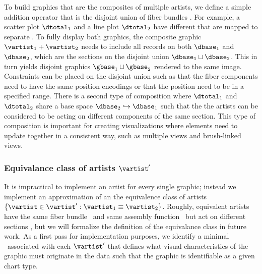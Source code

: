 \documentclass[../main.tex]{subfiles}
\begin{document}
To build graphics that are the composites of multiple artists, we define a simple addition operator that is the disjoint union of fiber bundles \dtotal.  For example, a scatter plot $\dtotal_1$ and a line plot $\dtotal_2$ have different \dbase that are mapped to separate \gbase. To fully display both graphics, the composite graphic $\vartist_1 + \vartist_2$ needs to include all records on both $\dbase_1$ and $\dbase_2$, which are the sections on the disjoint union $\dbase_1 \sqcup \dbase_2$. This in turn yields disjoint graphics $\gbase_1 \sqcup \gbase_2$ rendered to the same image. Constraints can be placed on the disjoint union such as that the fiber components need to have the same \vchannel position encodings or that the position \vsection need to be in a specified range. There is a second type of composition where $\dtotal_1$ and $\dtotal_2$ share a base space $\dbase_2 \hookrightarrow \dbase_1$ such that the the artists can be considered to be acting on different components of the same section. This type of composition is important for creating visualizations where elements need to update together in a consistent way, such as multiple views \cite{alboRadarComparativeEvaluation2016a, hullmanKeeping2018} and brush-linked views\cite{beckerBrushingScatterplots1987,bujaInteractiveData1991}. 

\subsubsection{Equivalance class of artists $\vartist^{\prime}$}
\label{sec:artist_equivalance}
It is impractical to implement an artist for every single graphic; instead we implement an approximation of an the equivalence class of artists $\{\vartist \in \vartist^{\prime}: \vartist_{1} \equiv \vartist_{2}\}$. Roughly, equivalent artists have the same fiber bundle \vtotal\ and same assembly function \vmark\ but act on different sections \vsection, but we will formalize the definition of the equivalance class in future work. As a first pass for implementation purposes, we identify a minimal \vfiber\ associated with each $\vartist^{\prime}$ that defines what visual characteristics of the graphic must originate in the data such that the graphic is identifiable as a given chart type.
\end{document}
